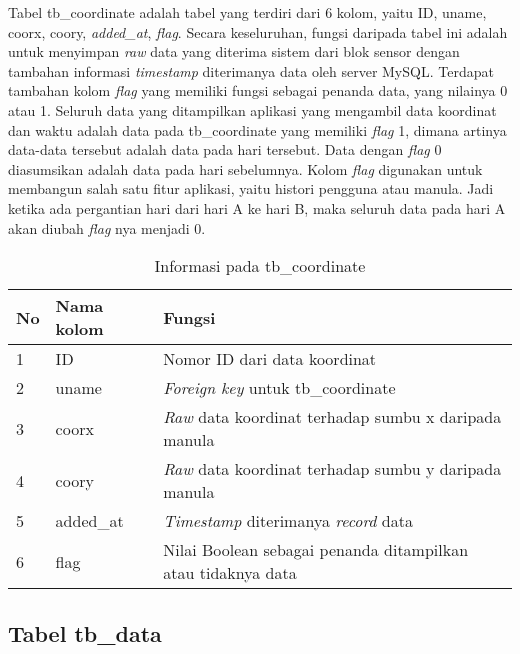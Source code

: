 Tabel tb\_coordinate adalah tabel yang terdiri dari 6 kolom, yaitu ID, uname, coorx, coory, \textit{added\_at}, \textit{flag}. Secara keseluruhan, fungsi daripada tabel ini adalah untuk menyimpan \textit{raw} data yang diterima sistem dari blok sensor dengan tambahan informasi \textit{timestamp} diterimanya data oleh server MySQL. Terdapat tambahan kolom \textit{flag} yang memiliki fungsi sebagai penanda data, yang nilainya 0 atau 1. Seluruh data yang ditampilkan aplikasi yang mengambil data koordinat dan waktu adalah data pada tb\_coordinate yang memiliki \textit{flag} 1, dimana artinya data-data tersebut adalah data pada hari tersebut. Data dengan \textit{flag} 0 diasumsikan adalah data pada hari sebelumnya. Kolom \textit{flag} digunakan untuk membangun salah satu fitur aplikasi, yaitu histori pengguna atau manula. Jadi ketika ada pergantian hari dari hari A ke hari B, maka seluruh data pada hari A akan diubah \textit{flag} nya menjadi 0.
\begin{table}[]
	\caption{Informasi pada tb\_coordinate}
	\label{tab:tb-coordinate}
	\begin{tabular}{|l|l|p{5cm}|}
		\hline
		\textbf{No} & \textbf{Nama kolom} & \textbf{Fungsi} \\ \hline
		1 & ID & Nomor ID dari data koordinat \\ \hline
		2 & uname & \textit{Foreign key} untuk tb\_coordinate \\ \hline
		3 & coorx & \textit{Raw }data koordinat terhadap sumbu x daripada manula \\ \hline
		4 & coory & \textit{Raw} data koordinat terhadap sumbu y daripada manula \\ \hline
		5 & added\_at & \textit{Timestamp} diterimanya \textit{record} data \\ \hline
		6 & flag & Nilai Boolean sebagai penanda ditampilkan atau tidaknya data \\ \hline
	\end{tabular}
\end{table}
\subsection{Tabel tb\_data}
\vspace{1ex}

